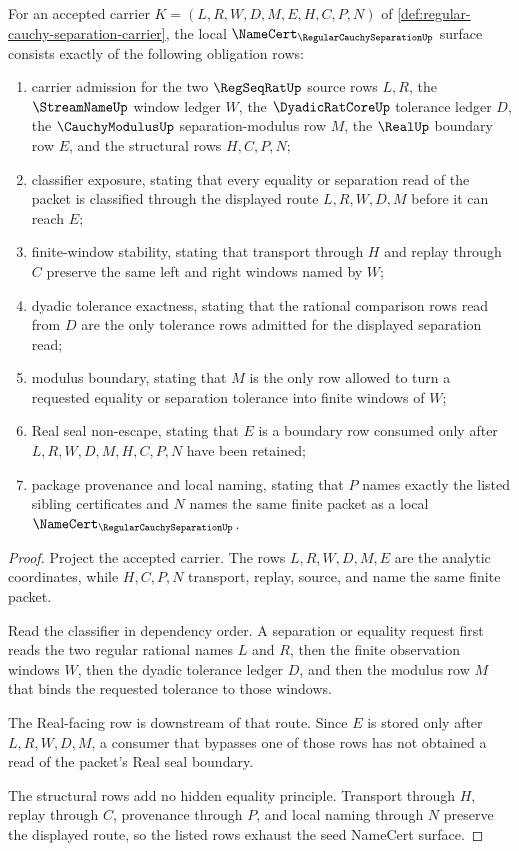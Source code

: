 \begin{theorem}
\label{thm:regular-cauchy-separation-namecert-obligations}
For an accepted carrier $K=(L,R,W,D,M,E,H,C,P,N)$ of \autoref{def:regular-cauchy-separation-carrier}, the local $\NameCert_{\RegularCauchySeparationUp}$ surface consists exactly of the following obligation rows:
\begin{enumerate}
\item carrier admission for the two $\RegSeqRatUp$ source rows $L,R$, the $\StreamNameUp$ window ledger $W$, the $\DyadicRatCoreUp$ tolerance ledger $D$, the $\CauchyModulusUp$ separation-modulus row $M$, the $\RealUp$ boundary row $E$, and the structural rows $H,C,P,N$;
\item classifier exposure, stating that every equality or separation read of the packet is classified through the displayed route $L,R,W,D,M$ before it can reach $E$;
\item finite-window stability, stating that transport through $H$ and replay through $C$ preserve the same left and right windows named by $W$;
\item dyadic tolerance exactness, stating that the rational comparison rows read from $D$ are the only tolerance rows admitted for the displayed separation read;
\item modulus boundary, stating that $M$ is the only row allowed to turn a requested equality or separation tolerance into finite windows of $W$;
\item Real seal non-escape, stating that $E$ is a boundary row consumed only after $L,R,W,D,M,H,C,P,N$ have been retained;
\item package provenance and local naming, stating that $P$ names exactly the listed sibling certificates and $N$ names the same finite packet as a local $\NameCert_{\RegularCauchySeparationUp}$.
\end{enumerate}
\end{theorem}
\begin{proof}
Project the accepted carrier. The rows $L,R,W,D,M,E$ are the analytic coordinates, while $H,C,P,N$ transport, replay, source, and name the same finite packet.

Read the classifier in dependency order. A separation or equality request first reads the two regular rational names $L$ and $R$, then the finite observation windows $W$, then the dyadic tolerance ledger $D$, and then the modulus row $M$ that binds the requested tolerance to those windows.

The Real-facing row is downstream of that route. Since $E$ is stored only after $L,R,W,D,M$, a consumer that bypasses one of those rows has not obtained a read of the packet's Real seal boundary.

The structural rows add no hidden equality principle. Transport through $H$, replay through $C$, provenance through $P$, and local naming through $N$ preserve the displayed route, so the listed rows exhaust the seed NameCert surface.
\end{proof}

